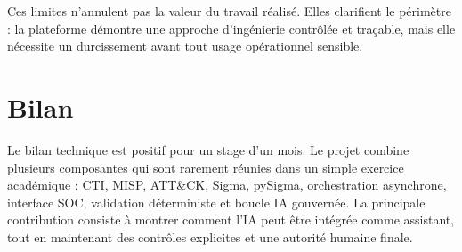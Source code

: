 Ces limites n'annulent pas la valeur du travail réalisé. Elles clarifient le périmètre : la plateforme démontre une approche d'ingénierie contrôlée et traçable, mais elle nécessite un durcissement avant tout usage opérationnel sensible.

\section{Bilan}

Le bilan technique est positif pour un stage d'un mois. Le projet combine plusieurs composantes qui sont rarement réunies dans un simple exercice académique : CTI, MISP, ATT\&CK, Sigma, pySigma, orchestration asynchrone, interface SOC, validation déterministe et boucle IA gouvernée. La principale contribution consiste à montrer comment l'IA peut être intégrée comme assistant, tout en maintenant des contrôles explicites et une autorité humaine finale.
